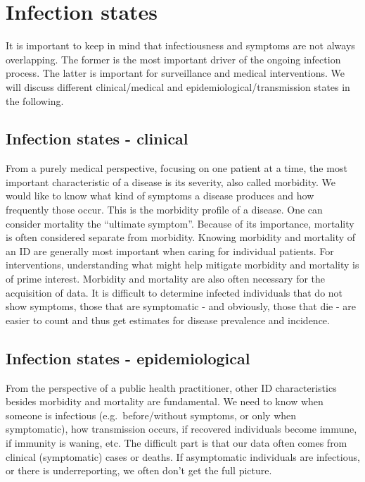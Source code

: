 \documentclass[]{book}
\theoremstyle{definition}
\theoremstyle{definition}
\theoremstyle{definition}
\theoremstyle{remark}
\begin{document}
\section{Infection states}\label{infection-states}

It is important to keep in mind that infectiousness and symptoms are not
always overlapping. The former is the most important driver of the
ongoing infection process. The latter is important for surveillance and
medical interventions. We will discuss different clinical/medical and
epidemiological/transmission states in the following.

\subsection{Infection states -
clinical}\label{infection-states---clinical}

From a purely medical perspective, focusing on one patient at a time,
the most important characteristic of a disease is its severity, also
called morbidity. We would like to know what kind of symptoms a disease
produces and how frequently those occur. This is the morbidity profile
of a disease. One can consider mortality the ``ultimate symptom''.
Because of its importance, mortality is often considered separate from
morbidity. Knowing morbidity and mortality of an ID are generally most
important when caring for individual patients. For interventions,
understanding what might help mitigate morbidity and mortality is of
prime interest. Morbidity and mortality are also often necessary for the
acquisition of data. It is difficult to determine infected individuals
that do not show symptoms, those that are symptomatic - and obviously,
those that die - are easier to count and thus get estimates for disease
prevalence and incidence.

\subsection{Infection states -
epidemiological}\label{infection-states---epidemiological}

From the perspective of a public health practitioner, other ID
characteristics besides morbidity and mortality are fundamental. We need
to know when someone is infectious (e.g.~before/without symptoms, or
only when symptomatic), how transmission occurs, if recovered
individuals become immune, if immunity is waning, etc. The difficult
part is that our data often comes from clinical (symptomatic) cases or
deaths. If asymptomatic individuals are infectious, or there is
underreporting, we often don't get the full picture.
\end{document}
